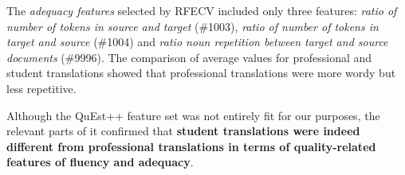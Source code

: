 \label{pg:quest_adequacy_feats_for_vars}
The \textit{adequacy features} selected by RFECV included only three features: \textit{ratio of number of tokens in source and target} (\#1003), \textit{ratio of number of tokens in target and source} (\#1004) and \textit{ratio noun repetition between target and source documents} (\#9996). The comparison of average values for professional and student translations showed that professional translations were more wordy but less repetitive. 

Although the QuEst++ feature set was not entirely fit for our purposes, the relevant parts of it confirmed that \textbf{student translations were indeed different from professional translations in terms of quality-related features of fluency and adequacy}.


